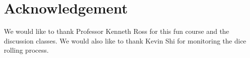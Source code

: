 \section{Acknowledgement}
We would like to thank Professor Kenneth Ross for this fun course and the discussion classes. We would also like to thank Kevin Shi for monitoring the dice rolling process.